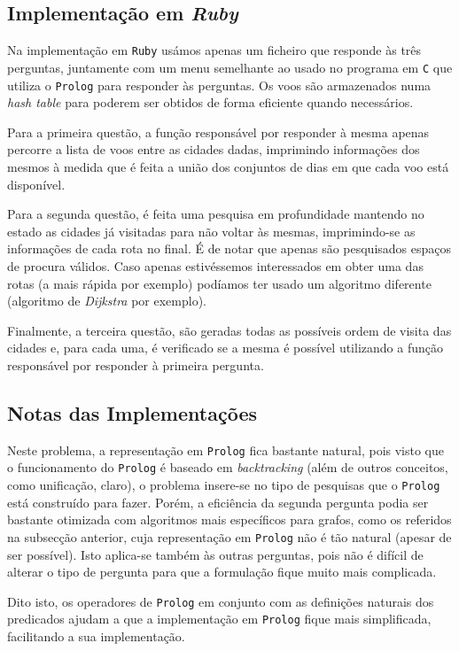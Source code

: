 \documentclass[12pt,a4paper,oneside]{article}
\begin{document}
\subsection{Implementação em \textit{Ruby}}

Na implementação em \texttt{Ruby} usámos apenas um ficheiro que
responde às três perguntas, juntamente com um menu semelhante ao usado
no programa em \texttt{C} que utiliza o \texttt{Prolog} para responder
às perguntas. Os voos são armazenados numa \textit{hash table} para
poderem ser obtidos de forma eficiente quando necessários.

Para a primeira questão, a função responsável por responder à mesma
apenas percorre a lista de voos entre as cidades dadas, imprimindo
informações dos mesmos à medida que é feita a união dos conjuntos de
dias em que cada voo está disponível.

Para a segunda questão, é feita uma pesquisa em profundidade mantendo
no estado as cidades já visitadas para não voltar às mesmas,
imprimindo-se as informações de cada rota no final. É de notar que
apenas são pesquisados espaços de procura válidos. Caso apenas
estivéssemos interessados em obter uma das rotas (a mais rápida por
exemplo) podíamos ter usado um algoritmo diferente (algoritmo de
\textit{Dijkstra} por exemplo).

Finalmente, a terceira questão, são geradas todas as possíveis ordem de
visita das cidades e, para cada uma, é verificado se a mesma é possível
utilizando a função responsável por responder à primeira pergunta.

\subsection{Notas das Implementações}

Neste problema, a representação em \texttt{Prolog} fica bastante
natural, pois visto que o funcionamento do \texttt{Prolog} é baseado
em \textit{backtracking} (além de outros conceitos, como unificação,
claro), o problema insere-se no tipo de pesquisas que o
\texttt{Prolog} está construído para fazer. Porém, a eficiência da
segunda pergunta podia ser bastante otimizada com algoritmos mais
específicos para grafos, como os referidos na subsecção anterior, cuja
representação em \texttt{Prolog} não é tão natural (apesar de ser
possível). Isto aplica-se também às outras perguntas, pois não é
difícil de alterar o tipo de pergunta para que a formulação fique
muito mais complicada.

Dito isto, os operadores de \texttt{Prolog} em conjunto com as
definições naturais dos predicados ajudam a que a implementação em
\texttt{Prolog} fique mais simplificada, facilitando a sua
implementação.
\end{document}
